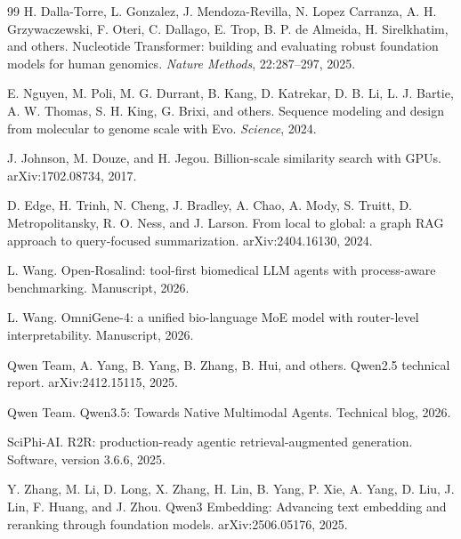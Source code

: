 \documentclass[11pt]{article}
\begin{document}
\begin{thebibliography}{99}
H. Dalla-Torre, L. Gonzalez, J. Mendoza-Revilla, N. Lopez Carranza, A. H. Grzywaczewski, F. Oteri, C. Dallago, E. Trop, B. P. de Almeida, H. Sirelkhatim, and others.
Nucleotide Transformer: building and evaluating robust foundation models for human genomics.
\emph{Nature Methods}, 22:287--297, 2025.

E. Nguyen, M. Poli, M. G. Durrant, B. Kang, D. Katrekar, D. B. Li, L. J. Bartie, A. W. Thomas, S. H. King, G. Brixi, and others.
Sequence modeling and design from molecular to genome scale with Evo.
\emph{Science}, 2024.

J. Johnson, M. Douze, and H. Jegou.
Billion-scale similarity search with GPUs.
arXiv:1702.08734, 2017.

D. Edge, H. Trinh, N. Cheng, J. Bradley, A. Chao, A. Mody, S. Truitt, D. Metropolitansky, R. O. Ness, and J. Larson.
From local to global: a graph RAG approach to query-focused summarization.
arXiv:2404.16130, 2024.

L. Wang.
Open-Rosalind: tool-first biomedical LLM agents with process-aware benchmarking.
Manuscript, 2026.

L. Wang.
OmniGene-4: a unified bio-language MoE model with router-level interpretability.
Manuscript, 2026.

Qwen Team, A. Yang, B. Yang, B. Zhang, B. Hui, and others.
Qwen2.5 technical report.
arXiv:2412.15115, 2025.

Qwen Team.
Qwen3.5: Towards Native Multimodal Agents.
Technical blog, 2026.

SciPhi-AI.
R2R: production-ready agentic retrieval-augmented generation.
Software, version 3.6.6, 2025.

Y. Zhang, M. Li, D. Long, X. Zhang, H. Lin, B. Yang, P. Xie, A. Yang, D. Liu, J. Lin, F. Huang, and J. Zhou.
Qwen3 Embedding: Advancing text embedding and reranking through foundation models.
arXiv:2506.05176, 2025.

\end{thebibliography}
\end{document}

